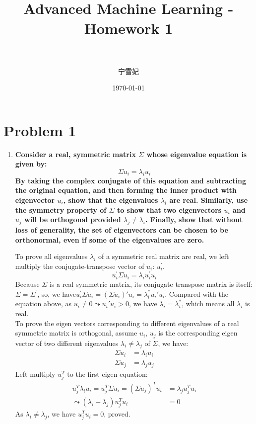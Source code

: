 \documentclass[paper=a4, fontsize=11pt]{scrartcl} %
\title{	
\normalfont \normalsize 
\horrule{0.5pt} \\[0.4cm] %
\huge Advanced Machine Learning - Homework 1\\ %
\horrule{2pt} \\[0.5cm] %
}
\author{宁雪妃} %
\date{\normalsize\today} %
\numberwithin{equation}{section} %
\numberwithin{figure}{section} %
\numberwithin{table}{section} %
\begin{document}
\maketitle %

\section{Problem 1}
\begin{enumerate}[a]
\item \textbf{Consider a real, symmetric matrix $\Sigma$ whose eigenvalue equation is given by:}
  \[
  \Sigma u_i = \lambda_i u_i
  \]
  \textbf{By taking the complex conjugate of this equation and subtracting the original equation, and then forming the inner product with eigenvector $u_i$, show that the eigenvalues $\lambda_i$ are real. Similarly, use the symmetry property of $\Sigma$ to show that two eigenvectors $u_i$ and $u_j$ will be orthogonal provided $\lambda_j \neq \lambda_i$. Finally, show that without loss of generality, the set of eigenvectors can be chosen to be orthonormal, even if some of the eigenvalues are zero.}

  To prove all eigenvalues $\lambda_i$ of a symmetric real matrix are real, we left multiply the conjugate-transpose vector of $u_i$: $u_i^{'}$.
  \[
  u_i^{'} \Sigma u_i = \lambda_i u_i^{'} u_i
  \]
  Because $\Sigma$ is a real symmetric matrix, its conjugate transpose matrix is itself: $\Sigma = \Sigma^{'}$, so, we have$u_i^{'} \Sigma u_i = (\Sigma u_i)' u_i = \lambda_i^{*} u_i' u_i$. Compared with the equation above, as $u_i \neq 0 \leadsto u_i' u_i > 0$, we have $\lambda_i = \lambda_i^{*}$, which means all $\lambda_i$ is real. \\

  To prove the eigen vectors corresponding to different eigenvalues of a real symmetric matrix is orthogonal, assume $u_i$, $u_j$ is the corresponding eigen vector of two different eigenvalues $\lambda_i \neq \lambda_j$ of $\Sigma$, we have:
  \begin{equation}
  \begin{split}
    \Sigma u_i & = \lambda_i u_i \\
    \Sigma u_j & = \lambda_j u_j
  \end{split}
  \end{equation}
  Left multiply $u_j^T$ to the first eigen equation:
  \begin{equation}
  \begin{split}
    u_j^T \lambda_i u_i = u_j^T \Sigma u_i = {(\Sigma u_j)}^T u_i & = \lambda_j u_j^T u_i \\
    \leadsto (\lambda_i - \lambda_j) u_j^T u_i & = 0
  \end{split}
  \end{equation}
  As $\lambda_i \neq \lambda_j$, we have $u_j^T u_i = 0$, proved.\\


\end{enumerate}
\end{document}
